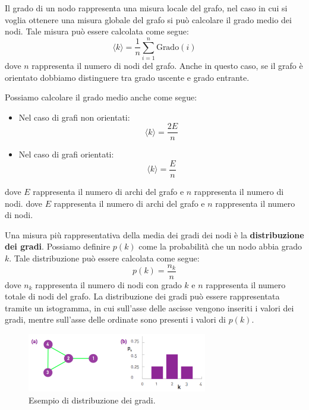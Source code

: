 Il grado di un nodo rappresenta una misura locale del grafo, nel caso in cui
si voglia ottenere una misura globale del grafo si può calcolare il grado
medio dei nodi. Tale misura può essere calcolata come segue:
\begin{equation}
    \langle k \rangle = \frac{1}{n} \sum_{i=1}^{n} \text{Grado}(i)
\end{equation}
dove $n$ rappresenta il numero di nodi del grafo. Anche in questo caso, se il
grafo è orientato dobbiamo distinguere tra grado uscente e grado entrante.
\begin{nota}
    Possiamo calcolare il grado medio anche come segue:
    \begin{itemize}
        \item Nel caso di grafi non orientati:
              \begin{equation}
                  \langle k \rangle = \frac{2E}{n}
              \end{equation}
        \item Nel caso di grafi orientati:
              \begin{equation}
                  \langle k \rangle = \frac{E}{n}
              \end{equation}
    \end{itemize}
    dove $E$ rappresenta il numero di archi del grafo e $n$ rappresenta il
    numero di nodi.
    dove $E$ rappresenta il numero di archi del grafo e $n$ rappresenta il
    numero di nodi.
\end{nota}
Una misura più rappresentativa della media dei gradi dei nodi è la \textbf{distribuzione
    dei gradi}. Possiamo definire $p(k)$ come la probabilità che un nodo abbia
grado $k$. Tale distribuzione può essere calcolata come segue:
\begin{equation}
    p(k) = \frac{n_k}{n}
\end{equation}
dove $n_k$ rappresenta il numero di nodi con grado $k$ e $n$ rappresenta il
numero totale di nodi del grafo. La distribuzione dei gradi può essere
rappresentata tramite un istogramma, in cui sull'asse delle ascisse vengono
inseriti i valori dei gradi, mentre sull'asse delle ordinate sono presenti i
valori di $p(k)$.
\begin{figure}[!ht]
    \centering
    \includegraphics[width=0.7\textwidth]{./img/net/degreedist.png}
    \caption{Esempio di distribuzione dei gradi.}
    \label{fig:degree_distribution}
\end{figure}
